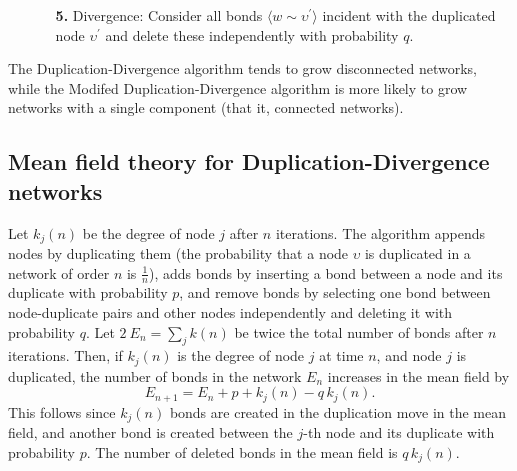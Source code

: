 \documentclass[12pt]{iopart}
\def\edge#1#2{{\langle #1{\sim}#2 \rangle}}
\def\thin{\:\!}
\begin{document}
\begin{enumerate}
\item[\bf ] 
\begin{enumerate}
\item[\bf 5.] Divergence: Consider all bonds $\edge{w}{\upsilon^\prime}$ incident
with the duplicated node $\upsilon^\prime$ and delete these independently
with probability $q$.
\end{enumerate}
\end{enumerate}

The Duplication-Divergence algorithm tends to grow disconnected networks, while the
Modifed Duplication-Divergence algorithm is more likely to grow networks with a
single component (that it, connected networks).

\subsection{Mean field theory for Duplication-Divergence networks}
Let $k_j(n)$ be the degree of node $j$ after $n$ iterations.  The algorithm appends
nodes by duplicating them (the probability that a node $\upsilon$ is duplicated
in a network of order $n$ is $\frac{1}{n}$), adds bonds by inserting a bond
between a node and its duplicate with probability $p$, and remove bonds 
by selecting one bond between node-duplicate pairs and other nodes independently
and deleting it with probability $q$.  Let $2\thin E_n = \sum_j k(n)$ be twice the total 
number of bonds after $n$ iterations. Then, if $ k_j(n)$ is the
degree of node $j$ at time $n$, and node $j$ is duplicated, the number of
bonds in the network $E_n$ increases in the mean field by
\begin{equation}
E_{n+1} = E_n + p + k_j(n) - q\, k_j(n) .
\label{eqn28}  %
\end{equation}
This follows since $k_j(n)$ bonds are created in the duplication
move in the mean field, and another bond is created between the $j$-th node 
and its duplicate with probability $p$.  The number of deleted bonds in the mean 
field is $q\, k_j(n) $.
\end{document}
